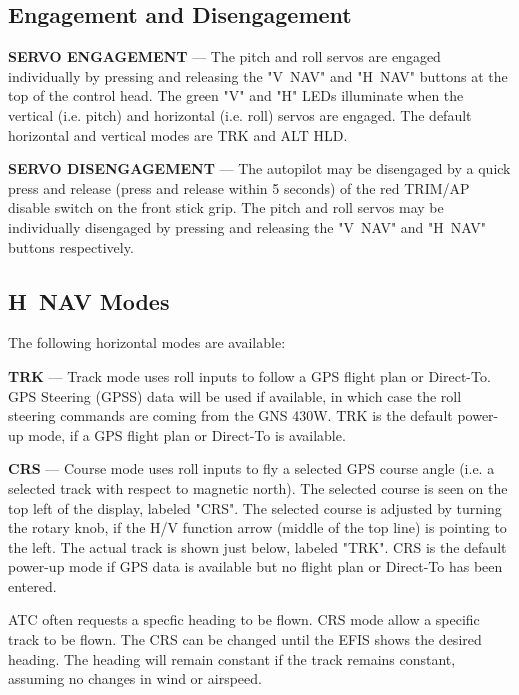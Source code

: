 \subsection*{Engagement and Disengagement}

\textbf{SERVO ENGAGEMENT} --- The pitch and roll servos are engaged individually by pressing and releasing the "V~NAV" and "H~NAV" buttons at the top of the control head. The green "V" and "H" LEDs illuminate when the vertical (i.e. pitch) and horizontal (i.e. roll) servos are engaged. The default horizontal and vertical modes are TRK and ALT HLD.

\textbf{SERVO DISENGAGEMENT} --- The autopilot may be disengaged by a quick press and release (press and release within 5 seconds) of the red TRIM/AP disable switch on the front stick grip. The pitch and roll servos may be individually disengaged by pressing and releasing the "V~NAV" and "H~NAV" buttons respectively. %

\subsection*{H~NAV Modes}
The following horizontal modes are available:

\textbf{TRK} --- Track mode uses roll inputs to follow a GPS flight plan or Direct-To. GPS Steering (GPSS) data will be used if available, in which case the roll steering commands are coming from the GNS 430W. TRK is the default power-up mode, if a GPS flight plan or Direct-To is available.

\textbf{CRS} --- Course mode uses roll inputs to fly a selected GPS course angle (i.e. a selected track with respect to magnetic north). The selected course is seen on the top left of the display, labeled "CRS". The selected course is adjusted by turning the rotary knob, if the H/V function arrow (middle of the top line) is pointing to the left. The actual track is shown just below, labeled "TRK". CRS is the default power-up mode if GPS data is available but no flight plan or Direct-To has been entered.

\begin{Note}
ATC often requests a specfic heading to be flown.  CRS mode allow a specific track to be flown.  The CRS can be changed until the EFIS shows the desired heading.  The heading will remain constant if the track remains constant, assuming no changes in wind or airspeed.
\end{Note}

